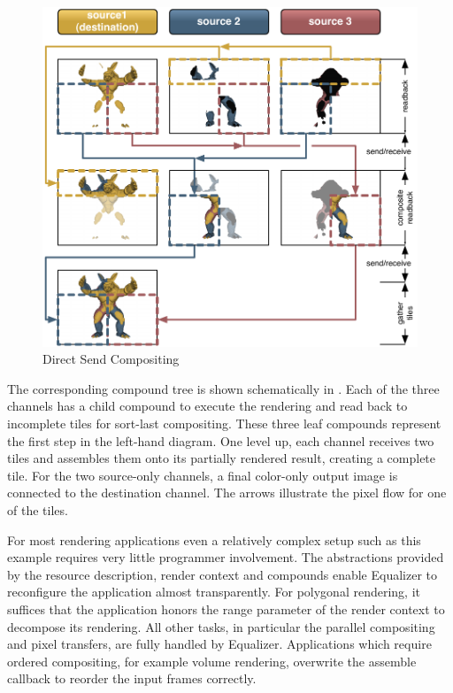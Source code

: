 \begin{figure}[ht]
 \includegraphics[width=\textwidth]{images/directSend}
 {\caption{\label{fDirectSend}Direct Send Compositing}}
\end{figure}

The corresponding compound tree is shown schematically in .
Each of the three channels has a child compound to execute the rendering and
read back to incomplete tiles for sort-last compositing. These three leaf
compounds represent the first step in the left-hand diagram. One level up, each
channel receives two tiles and assembles them onto its partially rendered
result, creating a complete tile. For the two source-only channels, a final
color-only output image is connected to the destination channel. The arrows
illustrate the pixel flow for one of the tiles.

For most rendering applications even a relatively complex setup such as this
example requires very little programmer involvement. The abstractions provided
by the resource description, render context and compounds enable Equalizer to
reconfigure the application almost transparently. For polygonal rendering, it
suffices that the application honors the \textsf{range} parameter of the render
context to decompose its rendering. All other tasks, in particular the parallel
compositing and pixel transfers, are fully handled by Equalizer. Applications
which require ordered compositing, for example volume rendering, overwrite the
assemble callback to reorder the input frames correctly.

